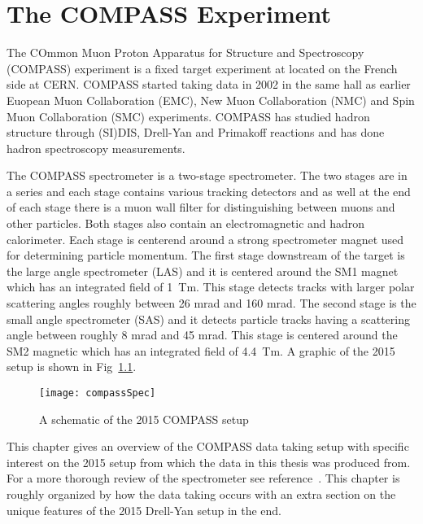 \chapter{The COMPASS Experiment} 
\label{Chap::compass}
\ifpdf
\graphicspath{{Chapters/COMPASS/Figs/Raster/}{Chapters/COMPASS/Figs/PDF/}{Chapters/COMPASS/Figs/}}
\else \graphicspath{{Chapters/COMPASS/Figs/Vector/}{Chapters/COMPASS/Figs/}} \fi

The COmmon Muon Proton Apparatus for Structure and Spectroscopy (COMPASS)
experiment is a fixed target experiment at located on the French side at CERN.
COMPASS started taking data in 2002 in the same hall as earlier Euopean Muon
Collaboration (EMC), New Muon Collaboration (NMC) and Spin Muon Collaboration
(SMC) experiments.  COMPASS has studied hadron structure through (SI)DIS,
Drell-Yan and Primakoff reactions and has done hadron spectroscopy measurements.
\par

The COMPASS spectrometer is a two-stage spectrometer.  The two stages are in a
series and each stage contains various tracking detectors and as well at the end
of each stage there is a muon wall filter for distinguishing between muons and
other particles.  Both stages also contain an electromagnetic and hadron
calorimeter.  Each stage is centerend around a strong spectrometer magnet used
for determining particle momentum.  The first stage downstream of the target is
the large angle spectrometer (LAS) and it is centered around the SM1 magnet
which has an integrated field of 1~Tm.  This stage detects tracks with larger
polar scattering angles roughly between 26 mrad and 160 mrad.  The second stage
is the small angle spectrometer (SAS) and it detects particle tracks having a
scattering angle between roughly 8 mrad and 45 mrad.  This stage is centered
around the SM2 magnetic which has an integrated field of 4.4~Tm.  A graphic of
the 2015 setup is shown in Fig~\ref{fig::compassSpec}.\par

\begin{figure}[h!t]
  \centering
  \texttt{[image: compassSpec]}
  \caption{A schematic of the 2015 COMPASS setup}
  \label{fig::compassSpec}
\end{figure}

This chapter gives an overview of the COMPASS data taking setup with specific
interest on the 2015 setup from which the data in this thesis was produced from.
For a more thorough review of the spectrometer see reference~\cite{compassSpec}.
This chapter is roughly organized by how the data taking occurs with an extra
section on the unique features of the 2015 Drell-Yan setup in the end.

